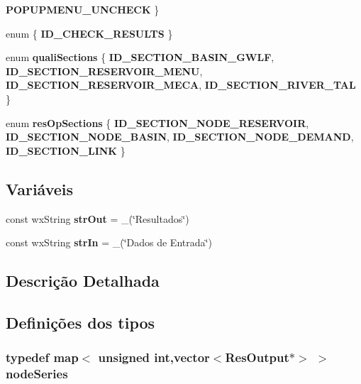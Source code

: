 \begin{DoxyCompactItemize}
{\bf P\+O\+P\+U\+P\+M\+E\+N\+U\+\_\+\+U\+N\+C\+H\+E\+CK}
 \}
\item 
enum \{ {\bf I\+D\+\_\+\+C\+H\+E\+C\+K\+\_\+\+R\+E\+S\+U\+L\+TS}
 \}
\item 
enum {\bf quali\+Sections} \{ {\bf I\+D\+\_\+\+S\+E\+C\+T\+I\+O\+N\+\_\+\+B\+A\+S\+I\+N\+\_\+\+G\+W\+LF}, 
{\bf I\+D\+\_\+\+S\+E\+C\+T\+I\+O\+N\+\_\+\+R\+E\+S\+E\+R\+V\+O\+I\+R\+\_\+\+M\+E\+NU}, 
{\bf I\+D\+\_\+\+S\+E\+C\+T\+I\+O\+N\+\_\+\+R\+E\+S\+E\+R\+V\+O\+I\+R\+\_\+\+M\+E\+CA}, 
{\bf I\+D\+\_\+\+S\+E\+C\+T\+I\+O\+N\+\_\+\+R\+I\+V\+E\+R\+\_\+\+T\+AL}
 \}
\item 
enum {\bf res\+Op\+Sections} \{ {\bf I\+D\+\_\+\+S\+E\+C\+T\+I\+O\+N\+\_\+\+N\+O\+D\+E\+\_\+\+R\+E\+S\+E\+R\+V\+O\+IR}, 
{\bf I\+D\+\_\+\+S\+E\+C\+T\+I\+O\+N\+\_\+\+N\+O\+D\+E\+\_\+\+B\+A\+S\+IN}, 
{\bf I\+D\+\_\+\+S\+E\+C\+T\+I\+O\+N\+\_\+\+N\+O\+D\+E\+\_\+\+D\+E\+M\+A\+ND}, 
{\bf I\+D\+\_\+\+S\+E\+C\+T\+I\+O\+N\+\_\+\+L\+I\+NK}
 \}
\end{DoxyCompactItemize}
\subsection*{Variáveis}
\begin{DoxyCompactItemize}
\item 
const wx\+String {\bf str\+Out} = \+\_\+(\char`\"{}Resultados\char`\"{})
\item 
const wx\+String {\bf str\+In} = \+\_\+(\char`\"{}Dados de Entrada\char`\"{})
\end{DoxyCompactItemize}


\subsection{Descrição Detalhada}


\subsection{Definições dos tipos}
\subsubsection[{node\+Series}]{\setlength{\rightskip}{0pt plus 5cm}typedef map$<$ unsigned int,vector$<${\bf Res\+Output}$\ast$$>$ $>$ {\bf node\+Series}}\label{group___resultados_gafff37dbb0ccb17d33eada3fc6d1381cf}


